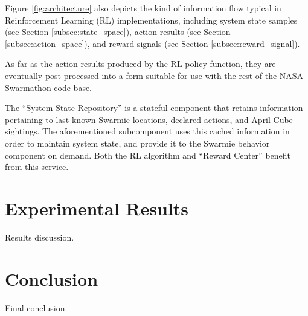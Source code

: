 \documentclass[sigconf,authordraft]{acmart}
\begin{document}
Figure \ref{fig:architecture} also depicts the kind of information flow typical in Reinforcement Learning (RL) implementations, including system state samples (see Section \ref{subsec:state_space}), action results (see Section \ref{subsec:action_space}), and reward signals (see Section \ref{subsec:reward_signal}).

As far as the action results produced by the RL policy function, they are eventually post-processed into a form suitable for use with the rest of the NASA Swarmathon code base.

The ``System State Repository'' is a stateful component that retains information pertaining to last known Swarmie locations, declared actions, and April Cube sightings. The aforementioned subcomponent uses this cached information in order to maintain system state, and provide it to the Swarmie behavior component on demand. Both the RL algorithm and ``Reward Center'' benefit from this service.

\section{Experimental Results}\label{sec:results}
Results discussion.

\section{Conclusion}\label{sec:conclusion}
Final conclusion.



\end{document}
